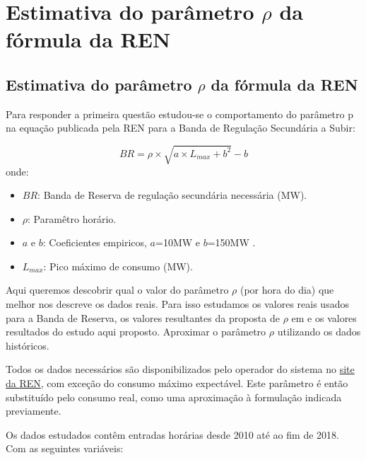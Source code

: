 \part{Estimativa do parâmetro $\rho$ da fórmula da REN}

\chapter{Estimativa do parâmetro $\rho$ da fórmula da REN}

Para responder a primeira questão estudou-se o comportamento do parâmetro p na equação publicada pela \gls{REN} para a Banda de Regulação Secundária a Subir:

\begin{equation} \label{eq:BRREN} 
    BR = \rho \times \sqrt{a \times  L_{max} + b^{2}} - b 
\end{equation}
onde:
\begin{itemize}
  \item $BR$: Banda de Reserva  de regulação secundária necessária (MW).
  \item $\rho$: Paramêtro horário.
  \item $a$ e $b$: Coeficientes empiricos, $a$=10MW e $b$=150MW .
  \item $L_{max}$: Pico máximo de consumo (MW).
\end{itemize}

Aqui queremos descobrir qual o valor do parâmetro $\rho$ (por hora do dia) que melhor nos descreve os dados reais. Para isso estudamos os valores reais usados para a Banda de Reserva, os valores resultantes da proposta de $\rho$  em \cite{Carneiro2016} e os valores resultados do estudo aqui proposto. Aproximar o parâmetro $\rho$  utilizando os dados históricos.\par
Todos os dados necessários são disponibilizados pelo operador do sistema no \href{https://mercado.ren.pt/PT/Electr}{site da \gls{REN}}, com exceção do consumo máximo expectável. Este parâmetro é então substituído pelo consumo real, como uma aproximação à formulação indicada previamente.\par
Os dados estudados contêm entradas horárias desde 2010 até ao fim de 2018. Com as seguintes variáveis:\\

\begin{table}[H] \centering \caption{Dados REN}  \end{table}

